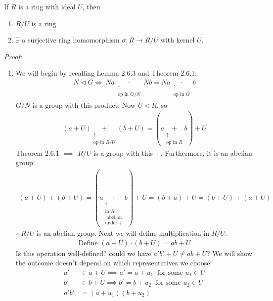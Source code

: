 \begin{lemma} 
If $R$ is a ring with ideal $U$, then
\begin{enumerate}[label=\roman*)]
    \item $R/U$ is a ring
    \item $\exists$ a surjective ring homomorphism $\sigma : R \rightarrow R/U$ with kernel $U$.
\end{enumerate}
\textit{Proof:}
\begin{enumerate}[label=\roman*)]
    \item We will begin by recalling Lemma 2.6.3 and Theorem 2.6.1:
    \begin{align}
        N \triangleleft G \iff \ Na \underset{\substack{\uparrow \\ \text{op in }G/N}}{\cdot} Nb = Na\underset{\substack{\uparrow \\ \text{op in }G}}{\cdot} b \nonumber
    \end{align}
    $G/N$ is a group with this product. Now $U \triangleleft R$, so 
    \begin{align}
        (a+U)\underset{\substack{\uparrow \\ \text{op in }R/U}}{+} (b+U) = (a\underset{\substack{\uparrow \\ \text{op in }R}}{+}b)+U \nonumber
    \end{align}
    Theorem 2.6.1 $\implies$ $R/U$ is a group with this $+$. Furthermore, it is an abelian group:
    \begin{align}
        (a+U)+(b+U)= (a\underset{\substack{\uparrow \\ \text{in }R \\ \text{ abelian} \\ \text{under +}}}{+}b)+U = (b+a) + U = (b+U) + (a+U)\nonumber
    \end{align}
    $\therefore \ R/U$ is an abelian group. Next we will define multiplication in $R/U$:
    \begin{align}
        \text{Define }(a+U)\cdot (b+U) = ab + U \nonumber
    \end{align}
    Is this operation well-defined? could we have $a'b'+U \neq ab+U$? We will show the outcome doesn't depend on which representatives we choose:
    \begin{align}
        a' &\in a+U \implies a'=a+u_1 \ \text{ for some }u_1\in U \nonumber \\
        b' &\in b+U \implies b'=b+u_2 \ \text{ for some }u_2 \in U \nonumber \\
        a'b'&= (a+u_1)(b+u_2) \nonumber \\

\end{align}
\end{enumerate}
\end{lemma}
